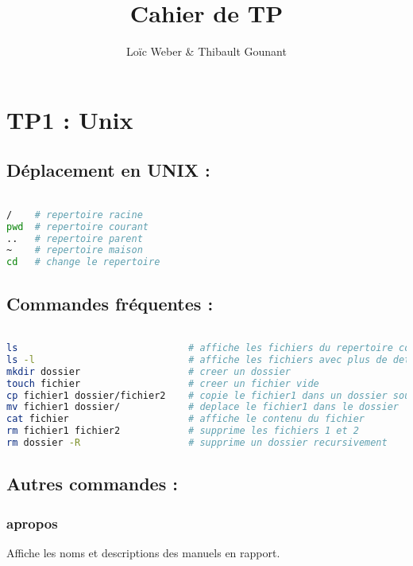 \documentclass{article}
\author{Loïc Weber \& Thibault Gounant}
\title{Cahier de TP}
\begin{document}
\setlength\parindent{0pt}

\maketitle

\renewcommand*\contentsname{Table des matières}
\tableofcontents

\section{TP1 : Unix}

\subsection{Déplacement en UNIX :}

\begin{lstlisting}[language=bash]

/    # repertoire racine
pwd  # repertoire courant
..   # repertoire parent
~    # repertoire maison
cd   # change le repertoire

\end{lstlisting}

\subsection{Commandes fréquentes :}

\begin{lstlisting}[language=bash]

ls                              # affiche les fichiers du repertoire courant
ls -l                           # affiche les fichiers avec plus de details
mkdir dossier                   # creer un dossier
touch fichier                   # creer un fichier vide
cp fichier1 dossier/fichier2    # copie le fichier1 dans un dossier sous le nom fichier2
mv fichier1 dossier/            # deplace le fichier1 dans le dossier
cat fichier                     # affiche le contenu du fichier
rm fichier1 fichier2            # supprime les fichiers 1 et 2
rm dossier -R                   # supprime un dossier recursivement

\end{lstlisting}

\subsection{Autres commandes :}

\subsubsection{apropos}
Affiche les noms et descriptions des manuels en rapport.
\end{document}
